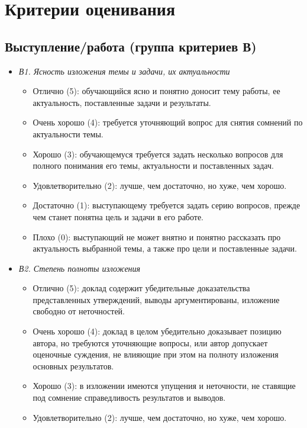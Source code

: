 \documentclass{article}
\begin{document}
\section{Критерии оценивания}


\subsection{Выступление/работа (группа критериев В)}
\begin{itemize}
    \item \textit{В1. Ясность изложения темы и задачи, их актуальности}
    \begin{itemize}
        \item Отлично (5): обучающийся ясно и понятно доносит тему работы, ее актуальность, поставленные задачи и результаты. 
        \item Очень хорошо (4): требуется уточняющий вопрос для снятия сомнений по актуальности темы.
        \item Хорошо (3): обучающемуся требуется задать несколько вопросов для полного понимания его темы, актуальности и поставленных задач.
        \item Удовлетворительно (2): лучше, чем достаточно, но хуже, чем хорошо.
        \item Достаточно (1): выступающему требуется задать серию вопросов, прежде чем станет понятна цель и задачи в его работе.
        \item Плохо (0): выступающий не может внятно и понятно рассказать про актуальность выбранной темы, а также про цели и поставленные задачи. 
    \end{itemize}
    \item \textit{В2. Степень полноты изложения}
    \begin{itemize}
        \item Отлично (5): доклад содержит убедительные доказательства представленных утверждений, выводы аргументированы, изложение свободно от неточностей. 
        \item Очень хорошо (4): доклад в целом убедительно доказывает позицию автора, но требуются уточняющие вопросы, или автор допускает оценочные суждения, не влияющие при этом на полноту изложения основных результатов.
        \item Хорошо (3): в изложении имеются упущения и неточности, не ставящие под сомнение справедливость результатов и выводов.
        \item Удовлетворительно (2): лучше, чем достаточно, но хуже, чем хорошо.

\end{itemize}
\end{itemize}
\end{document}
